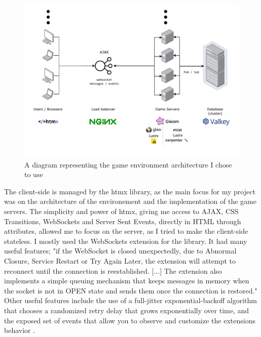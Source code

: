 \documentclass[]{final}
\begin{document}
\begin{figure}[ht!]
  \centering
  \includegraphics[width=\linewidth]{architecture}
  \vspace*{-1.5cm}
  \caption{A diagram representing the game environment architecture I chose to use}
  \label{fig: 3}
\end{figure}


\newpage

The client-side is managed by the htmx library, as the main focus for my project
was on the architecture of the environement and the implementation of the game
servers. The simplicity and power of htmx, giving me access to AJAX, CSS Transitions,
WebSockets and Server Sent Events, directly in HTML through attributes,\cite{noauthor_htmx_nodate} allowed me to
focus on the server, as I tried to make the client-side stateless. I mostly
used the WebSockets extension for the library. It had many useful features;
"if the WebSocket is closed unexpectedly, due to Abnormal Closure, Service Restart
or Try Again Later, the extension will attempt to reconnect until the connection
is reestablished. [...] The extension also implements a simple queuing mechanism that
keeps messages in memory when the socket is not in OPEN state and sends
them once the connection is restored."\cite{noauthor_htmx_ws_nodate} Other useful features include the
use of a full-jitter exponential-backoff algorithm that chooses a randomized
retry delay that grows exponentially over time, and the exposed
set of events that allow you to observe and customize the extensions behavior
\cite{noauthor_htmx_ws_nodate}.
\end{document}
